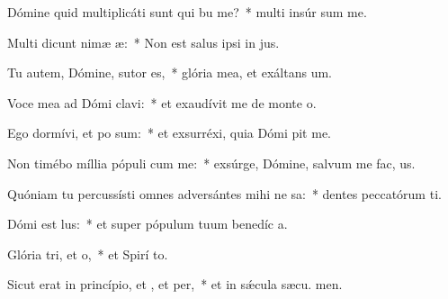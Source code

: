 \item Dómine quid multiplicáti sunt qui bu me?~* multi insúr sum me.
\item Multi dicunt nimæ æ:~* Non est salus ipsi in  jus.
\item Tu autem, Dómine, sutor  es,~* glória mea, et exáltans  um.
\item Voce mea ad Dómi clavi:~* et exaudívit me de monte  o.
\item Ego dormívi, et po sum:~* et exsurréxi, quia Dómi pit me.
\item Non timébo míllia pópuli cum me:~* exsúrge, Dómine, salvum me fac,  us.
\item Quóniam tu percussísti omnes adversántes mihi ne sa:~* dentes peccatórum ti.
\item Dómi est lus:~* et super pópulum tuum benedíc a.
\item Glória tri, et o,~* et Spirí to.
\item Sicut erat in princípio, et , et per,~* et in sǽcula sæcu. men.
